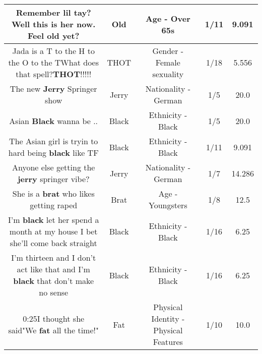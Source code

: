 \documentclass[11pt]{article}
\newlength\mylength
\begin{document}
\begin{center}
\begin{longtable}{|C{.65\mylength}|C{.30\mylength}|C{.12\mylength}|C{.12\mylength}|C{.12\mylength}|}
  \small Remember lil tay? Well this is her now. Feel \textbf{old} yet?\normalsize   & Old & Age - Over 65s & 1/11 & 9.091 \\  \hline
  \small Jada is a T to the H to the O to the TWhat does that spell?\textbf{THOT}!!!!!\normalsize   & THOT & Gender - Female sexuality & 1/18 & 5.556 \\  \hline
  \small The new \textbf{Jerry} Springer show\normalsize   & Jerry & Nationality - German & 1/5 & 20.0 \\  \hline
  \small Asian \textbf{Black} wanna be ..\normalsize   & Black & Ethnicity - Black & 1/5 & 20.0 \\  \hline
  \small The Asian girl is tryin to hard being \textbf{black} like TF\normalsize   & Black & Ethnicity - Black & 1/11 & 9.091 \\  \hline
  \small Anyone else getting the \textbf{jerry} springer vibe?\normalsize   & Jerry & Nationality - German & 1/7 & 14.286 \\  \hline
  \small She is a \textbf{brat} who likes getting raped\normalsize   & Brat & Age - Youngsters & 1/8 & 12.5 \\  \hline
  \small I'm \textbf{black} let her spend a month at my house I bet she'll come back straight\normalsize   & Black & Ethnicity - Black & 1/16 & 6.25 \\  \hline
  \small I'm thirteen and I don't act like that and I'm \textbf{black} that don't make no sense\normalsize   & Black & Ethnicity - Black & 1/16 & 6.25 \\  \hline
  \small 0:25I thought she said"We \textbf{fat} all the time!"\normalsize   & Fat & Physical Identity - Physical Features & 1/10 & 10.0 \\  \hline

\end{longtable}
\end{center}
\end{document}
